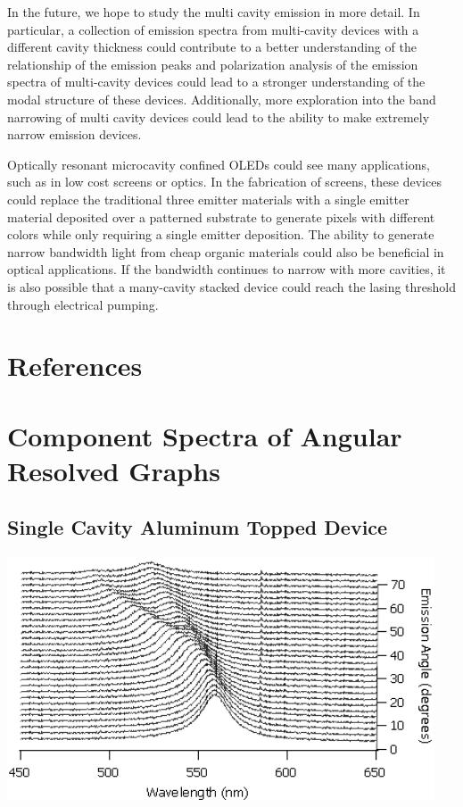 \documentclass{report}
\begin{document}
    In the future, we hope to study the multi cavity emission in more detail. In particular, a collection of emission spectra from multi-cavity devices with a different cavity thickness could contribute to a better understanding of the relationship of the emission peaks and polarization analysis of the emission spectra of multi-cavity devices could lead to a stronger understanding of the modal structure of these devices. Additionally, more exploration into the band narrowing of multi cavity devices could lead to the ability to make extremely narrow emission devices.
    
    Optically resonant microcavity confined OLEDs could see many applications, such as in low cost screens or optics. In the fabrication of screens, these devices could replace the traditional three emitter materials with a single emitter material deposited over a patterned substrate to generate pixels with different colors while only requiring a single emitter deposition. The ability to generate narrow bandwidth light from cheap organic materials could also be beneficial in optical applications. If the bandwidth continues to narrow with more cavities, it is also possible that a many-cavity stacked device could reach the lasing threshold through electrical pumping\cite{Baldo2002,Bulovi1998}. %
    
\chapter{References}
    \printbibliography[heading=none]

\appendix
\chapter{Component Spectra of Angular Resolved Graphs} \label{components}

    \section*{Single Cavity Aluminum Topped Device}
    \begin{center}
    \includegraphics[width=0.95\textwidth]{images/n1_al_top_waterfall.png}
    \end{center}
    
\end{document}
